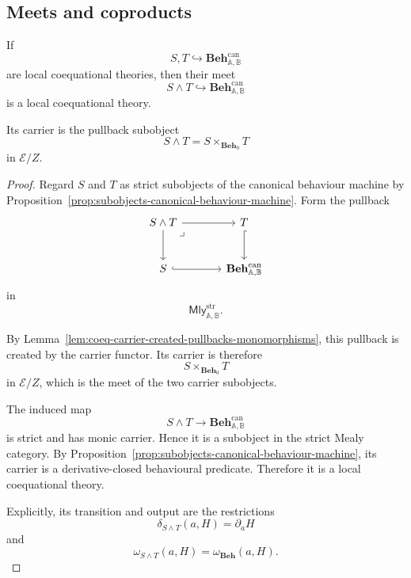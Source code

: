 \subsection{Meets and coproducts}
\label{subsec:meets-and-coproducts-local-theories}

\begin{lemma}
\label{lem:meets-local-theories}
    If
    \[
        S,T\hookrightarrow
        \mathbf{Beh}^{\mathrm{can}}_{\mathbb A,\mathbb B}
    \]
    are local coequational theories, then their meet
    \[
        S\wedge T
        \hookrightarrow
        \mathbf{Beh}^{\mathrm{can}}_{\mathbb A,\mathbb B}
    \]
    is a local coequational theory.

    Its carrier is the pullback subobject
    \[
        S\wedge T
        =
        S\times_{\mathbf{Beh}_0}T
    \]
    in \(\mathcal E/Z\).
\end{lemma}

\begin{proof}
    Regard \(S\) and \(T\) as strict subobjects of the canonical behaviour
    machine by
    Proposition~\ref{prop:subobjects-canonical-behaviour-machine}. Form the
    pullback
    \[
    \begin{tikzcd}[column sep=large, row sep=large]
        S\wedge T
            \arrow[r]
            \arrow[d]
            \arrow[dr, phantom, "\lrcorner", very near start]
        &
        T
            \arrow[d, hook]
        \\
        S
            \arrow[r, hook]
        &
        \mathbf{Beh}^{\mathrm{can}}_{\mathbb A,\mathbb B}
    \end{tikzcd}
    \]
    in
    \[
        \mathsf{Mly}^{\mathrm{str}}_{\mathbb A,\mathbb B}.
    \]

    By
    Lemma~\ref{lem:coeq-carrier-created-pullbacks-monomorphisms}, this
    pullback is created by the carrier functor. Its carrier is therefore
    \[
        S\times_{\mathbf{Beh}_0}T
    \]
    in \(\mathcal E/Z\), which is the meet of the two carrier subobjects.

    The induced map
    \[
        S\wedge T
        \longrightarrow
        \mathbf{Beh}^{\mathrm{can}}_{\mathbb A,\mathbb B}
    \]
    is strict and has monic carrier. Hence it is a subobject in the strict
    Mealy category. By
    Proposition~\ref{prop:subobjects-canonical-behaviour-machine}, its carrier
    is a derivative-closed behavioural predicate. Therefore it is a local
    coequational theory.

    Explicitly, its transition and output are the restrictions
    \[
        \delta_{S\wedge T}(a,H)=\partial_aH
    \]
    and
    \[
        \omega_{S\wedge T}(a,H)
        =
        \omega_{\mathbf{Beh}}(a,H).
    \]
\end{proof}

